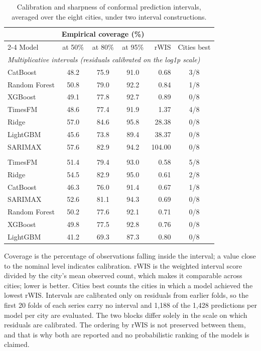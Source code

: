 \begin{table}[htbp]
\centering
\small
\caption{Calibration and sharpness of conformal prediction intervals, averaged over the
eight cities, under two interval constructions.}
\label{tab:intervals}
\begin{tabular}{lcccrc}
\toprule
 & \multicolumn{3}{c}{Empirical coverage (\%)} & & \\
\cmidrule(lr){2-4}
Model & at 50\% & at 80\% & at 95\% & rWIS & Cities best \\
\midrule
\multicolumn{6}{l}{\textit{Multiplicative intervals (residuals calibrated on the log1p scale)}} \\
\quad CatBoost & 48.2 & 75.9 & 91.0 & 0.68 & 3/8 \\
\quad Random Forest & 50.8 & 79.0 & 92.2 & 0.84 & 1/8 \\
\quad XGBoost & 49.1 & 77.8 & 92.7 & 0.89 & 0/8 \\
\quad TimesFM & 48.6 & 77.4 & 91.9 & 1.37 & 4/8 \\
\quad Ridge & 57.0 & 84.6 & 95.8 & 28.38 & 0/8 \\
\quad LightGBM & 45.6 & 73.8 & 89.4 & 38.37 & 0/8 \\
\quad SARIMAX & 57.6 & 82.9 & 94.2 & 104.00 & 0/8 \\
\addlinespace[4pt]
\multicolumn{6}{l}{\textit{Additive intervals (residuals calibrated on the raw scale)}} \\
\quad TimesFM & 51.4 & 79.4 & 93.0 & 0.58 & 5/8 \\
\quad Ridge & 54.5 & 82.9 & 95.0 & 0.61 & 2/8 \\
\quad CatBoost & 46.3 & 76.0 & 91.4 & 0.67 & 1/8 \\
\quad SARIMAX & 52.6 & 81.1 & 94.3 & 0.69 & 0/8 \\
\quad Random Forest & 50.2 & 77.6 & 92.1 & 0.71 & 0/8 \\
\quad XGBoost & 49.8 & 77.5 & 92.8 & 0.76 & 0/8 \\
\quad LightGBM & 41.2 & 69.3 & 87.3 & 0.80 & 0/8 \\
\bottomrule
\end{tabular}

\vspace{0.5em}
\begin{minipage}{\textwidth}
\footnotesize
Coverage is the percentage of observations falling inside the interval; a value close to
the nominal level indicates calibration. rWIS is the weighted interval score divided by
the city's mean observed count, which makes it comparable across cities; lower is better.
Cities best counts the cities in which a model achieved the lowest rWIS. Intervals are
calibrated only on residuals from earlier folds, so the first 20 folds of each
series carry no interval and 1{,}188 of the 1{,}428 predictions per model per city are
evaluated. The two blocks differ solely in the scale on which residuals are calibrated.
The ordering by rWIS is not preserved between them, and that is why both are reported and
no probabilistic ranking of the models is claimed.
\end{minipage}
\end{table}
